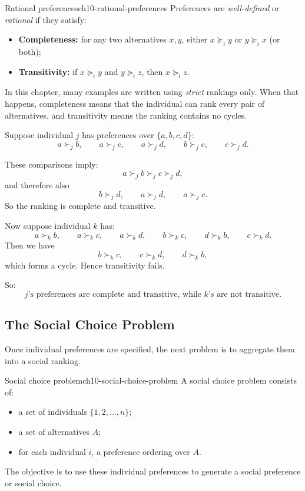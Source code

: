 \begin{definition}{Rational preferences}{ch10-rational-preferences}
Preferences are \emph{well-defined} or \emph{rational} if they satisfy:
\begin{itemize}
    \item \textbf{Completeness:} for any two alternatives $x,y$, either $x \succeq_i y$ or $y \succeq_i x$ (or both);
    \item \textbf{Transitivity:} if $x \succeq_i y$ and $y \succeq_i z$, then $x \succeq_i z$.
\end{itemize}
\end{definition}

\begin{examtip}
In this chapter, many examples are written using \emph{strict} rankings only. When that happens, completeness means that the individual can rank every pair of alternatives, and transitivity means the ranking contains no cycles.
\end{examtip}

\begin{examplebox}[title={Worked Example: Checking completeness and transitivity}]
Suppose individual $j$ has preferences over $\{a,b,c,d\}$:
\[
a \succ_j b,\qquad a \succ_j c,\qquad a \succ_j d,\qquad b \succ_j c,\qquad c \succ_j d.
\]

These comparisons imply:
\[
a \succ_j b \succ_j c \succ_j d,
\]
and therefore also
\[
b \succ_j d,\qquad a \succ_j d,\qquad a \succ_j c.
\]
So the ranking is complete and transitive.

Now suppose individual $k$ has:
\[
a \succ_k b,\qquad a \succ_k c,\qquad a \succ_k d,\qquad b \succ_k c,\qquad d \succ_k b,\qquad c \succ_k d.
\]
Then we have
\[
b \succ_k c,\qquad c \succ_k d,\qquad d \succ_k b,
\]
which forms a cycle. Hence transitivity fails.

So:
\[
\boxed{\text{$j$'s preferences are complete and transitive, while $k$'s are not transitive.}}
\]
\end{examplebox}

\subsection{The Social Choice Problem}

Once individual preferences are specified, the next problem is to aggregate them into a social ranking.

\begin{definition}{Social choice problem}{ch10-social-choice-problem}
A social choice problem consists of:
\begin{itemize}
    \item a set of individuals $\{1,2,\dots,n\}$;
    \item a set of alternatives $A$;
    \item for each individual $i$, a preference ordering over $A$.
\end{itemize}
The objective is to use these individual preferences to generate a social preference or social choice.
\end{definition}

